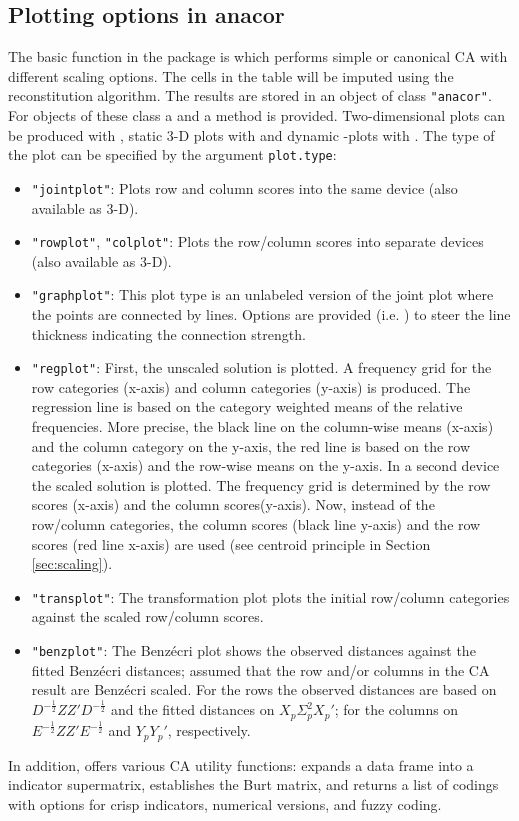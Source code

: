 \documentclass[article]{Z}
\begin{document}
\subsection{Plotting options in anacor}
\label{sec:plots}
The basic function in the package is  which performs simple or canonical CA with different scaling options. The  cells in the table will be imputed using the reconstitution algorithm. The results are stored in an object of class \texttt{"anacor"}. For objects of these class a  and a  method is provided. Two-dimensional plots can be produced with , static 3-D plots with  and dynamic -plots with . The type of the plot can be specified by the argument \texttt{plot.type}:
\begin{itemize}
 \item \texttt{"jointplot"}: Plots row and column scores into the same device (also available as 3-D).
 \item \texttt{"rowplot"}, \texttt{"colplot"}: Plots the row/column scores into separate devices (also available as 3-D).
 \item \texttt{"graphplot"}: This plot type is an unlabeled version of the joint plot where the points are connected by lines. Options are provided (i.e. ) to steer the line thickness indicating the connection strength.
 \item \texttt{"regplot"}: First, the unscaled solution is plotted. A frequency grid for the row 
categories (x-axis) and column categories (y-axis) is produced. 
The regression line is based on the category weighted means of the relative frequencies. More precise, the black line on the column-wise means (x-axis) and the column category on the y-axis, the red line is based on the row categories (x-axis) and the row-wise means on the y-axis. 
In a second device the scaled solution is plotted. The frequency grid is determined by 
the row scores (x-axis) and the column scores(y-axis). 
Now, instead of the row/column categories, the column scores (black line y-axis) 
and the row scores (red line x-axis) are used (see centroid principle in Section \ref{sec:scaling}).
 \item \texttt{"transplot"}: The transformation plot plots the initial row/column categories against the scaled row/column scores.
 \item \texttt{"benzplot"}: The Benz\'ecri plot shows the observed distances against the fitted Benz\'ecri distances; assumed that the row and/or columns in the CA result are Benz\'ecri scaled. For the rows the observed distances are based on $D^{-\frac12}ZZ'D^{-\frac12}$ and the fitted distances on $X_p\Sigma^2_pX_p'$; for the columns on $E^{-\frac12}ZZ'E^{-\frac12}$ and $Y_pY_p'$, respectively.
\end{itemize}
In addition,  offers various CA utility functions:  expands a data frame into a indicator supermatrix,  establishes the Burt matrix, and  returns a list of codings with options for crisp indicators, numerical versions, and fuzzy coding.
\end{document}
